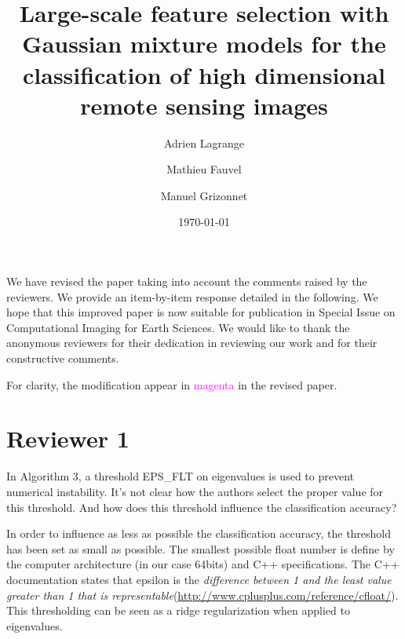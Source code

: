 \documentclass[a4paper,10pt,DIV=16]{scrartcl}
\title{Large-scale feature selection with Gaussian mixture models for the classification of high dimensional remote sensing images}
\date{\today}
\author{Adrien Lagrange \and Mathieu Fauvel \and Manuel Grizonnet}
\begin{document}
\maketitle

We have revised  the paper taking into account the  comments raised by
the reviewers.   We provide an  item-by-item response detailed  in the
following.   We hope  that this  improved  paper is  now suitable  for
publication  in  {\sc  Special Issue on Computational Imaging for Earth Sciences}.   We would  like  to  thank  the
anonymous reviewers for their dedication in reviewing our work and for
their constructive comments.

For clarity,  the modification appear  in \textcolor{magenta}{magenta}
in the revised paper.


\section{Reviewer 1}

\begin{revbox}
In Algorithm 3, a threshold EPS\_FLT on eigenvalues is used to prevent numerical instability. It’s not clear how the authors select the proper value for this threshold. And how does this threshold influence the classification accuracy?

  \begin{resbox}
    In order to influence as less as possible the classification accuracy, the threshold has been set as small as possible. The smallest possible float number is define by the computer architecture (in our case 64bits) and C++ specifications. The C++ documentation states that epsilon is the \emph{difference between 1 and the least value greater than 1 that is representable}(\url{http://www.cplusplus.com/reference/cfloat/}).
    This thresholding can be seen as a ridge regularization when applied to eigenvalues. 
  \end{resbox}

\end{revbox}
\end{document}
